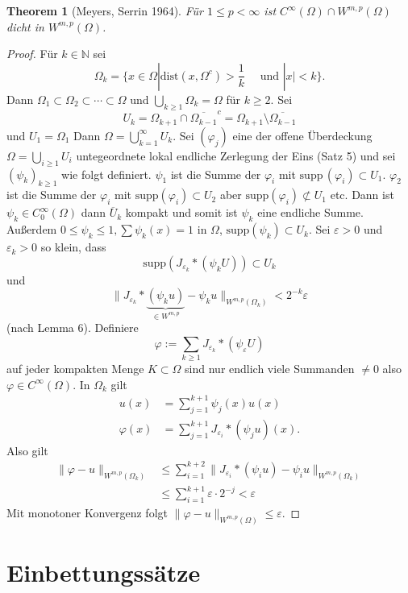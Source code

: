 \documentclass[
paper=a4,
bibtotocnumbered,
liststotocnumbered,
tablecaptionabove,
pointlessnumbers,
twoside,
openright,
10pt
]
{report}
\newcommand{\supp}{\mathrm{supp}\,}
\let\phi\varphi
\newtheorem{thm}{Theorem}[chapter]
\theoremstyle{definition}
\numberwithin{equation}{chapter}
\begin{document}
\begin{thm}[Meyers, Serrin 1964]
Für $1\le p <\infty$ ist $C^\infty(\Omega) \cap W^{m,p}(\Omega)$ dicht in $W^{m,p}(\Omega)$.
\end{thm}
\begin{proof}
Für $k\in \mathbb N$ sei
$$
\Omega_k = \{x\in \Omega |\text{dist} (x, \Omega^c) >\frac{1}{k} \quad \text{ und } |x| <k\}.
$$
Dann $\Omega_1 \subset \Omega_2 \subset \cdots \subset \Omega$ und $\bigcup_{k\ge 1} \Omega_k = \Omega$ für 
$k\ge 2$. Sei $$U_k = \Omega_{k+1} \cap \overline{\Omega_{k-1}}^c = \Omega_{k+1} \setminus \overline{\Omega_{k-1}}$$
und $U_1= \Omega_1$ Dann $\Omega = \bigcup_{k=1}^\infty U_k$. Sei $(\phi_j)$ eine der offene Überdeckung $\Omega = \bigcup_{i \ge 1} U_i$ untegeordnete lokal endliche Zerlegung der Eins (Satz 5) und sei $(\psi_k)_{k\ge 1}$ wie folgt definiert. $\psi_1$ ist die Summe der $\phi_i$ mit $\supp(\phi_i) \subset U_1$. $\phi_2$ ist die Summe der $\phi_i$ mit $\text{supp}(\phi_i) \subset U_2$ aber $\text{supp}(\phi_i) \not \subset U_1$ etc.  Dann ist $\psi_k \in C_0^\infty(\Omega)$ dann $\overline U_k$ kompakt und somit ist $\psi_k$ eine endliche Summe. Außerdem $0 \le \psi_k \le 1, \sum \psi_k(x)=1$ in $\Omega$, $\text{supp}(\psi_k) \subset U_k$.  Sei $\varepsilon>0$ und $\varepsilon_k >0$ so klein, dass  
$$
\text{supp}(J_{\varepsilon_k} * ( \psi_k U)) \subset U_k
$$
und $$\| J_{\varepsilon_k}*\underbrace{(\psi_k u)}_{\in W^{m,p}}- \psi_k u\|_{W^{m,p}(\Omega_k)} < 2^{-k}\varepsilon$$
(nach Lemma 6). Definiere 
$$
\phi:= \sum_{k\ge 1} J_{\varepsilon_k} * (\psi_\varepsilon U)
$$
auf jeder kompakten Menge $K\subset \Omega$ sind nur endlich viele Summanden $\neq 0$ also $\phi \in C^\infty(\Omega)$. In $\Omega_k$ gilt
\begin{align*}
u(x) &= \sum_{j=1}^{k+1} \psi_j(x) u(x)\\
\phi(x) &= \sum_{j=1}^{k+1} J_{\varepsilon_i} * (\psi_j u) (x).
\end{align*}
Also gilt 
\begin{align*}
\| \phi - u \| _{W^{m,p}(\Omega_k)} &\le \sum_{i=1}^{k+2} \| J_{\varepsilon_i} * (\psi_i u) - \psi_i u\|_{W^{m,p}(\Omega_k)} \\
&\le \sum_{i=1}^{k+1} \varepsilon \cdot 2^{-j} < \varepsilon
\end{align*}
Mit monotoner Konvergenz folgt $\|\phi- u\|_{W^{m,p}(\Omega)}\le \varepsilon$.
\end{proof}
\section{Einbettungssätze}
\end{document}
